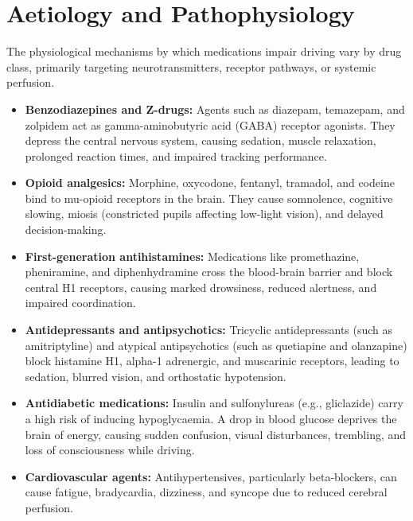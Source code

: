 \section*{Aetiology and Pathophysiology}
The physiological mechanisms by which medications impair driving vary by drug class, primarily targeting neurotransmitters, receptor pathways, or systemic perfusion.
\begin{itemize}
    \item \textbf{Benzodiazepines and Z-drugs:} Agents such as diazepam, temazepam, and zolpidem act as gamma-aminobutyric acid (GABA) receptor agonists. They depress the central nervous system, causing sedation, muscle relaxation, prolonged reaction times, and impaired tracking performance.
    \item \textbf{Opioid analgesics:} Morphine, oxycodone, fentanyl, tramadol, and codeine bind to mu-opioid receptors in the brain. They cause somnolence, cognitive slowing, miosis (constricted pupils affecting low-light vision), and delayed decision-making.
    \item \textbf{First-generation antihistamines:} Medications like promethazine, pheniramine, and diphenhydramine cross the blood-brain barrier and block central H1 receptors, causing marked drowsiness, reduced alertness, and impaired coordination.
    \item \textbf{Antidepressants and antipsychotics:} Tricyclic antidepressants (such as amitriptyline) and atypical antipsychotics (such as quetiapine and olanzapine) block histamine H1, alpha-1 adrenergic, and muscarinic receptors, leading to sedation, blurred vision, and orthostatic hypotension.
    \item \textbf{Antidiabetic medications:} Insulin and sulfonylureas (e.g., gliclazide) carry a high risk of inducing hypoglycaemia. A drop in blood glucose deprives the brain of energy, causing sudden confusion, visual disturbances, trembling, and loss of consciousness while driving.
    \item \textbf{Cardiovascular agents:} Antihypertensives, particularly beta-blockers, can cause fatigue, bradycardia, dizziness, and syncope due to reduced cerebral perfusion.
\end{itemize}

